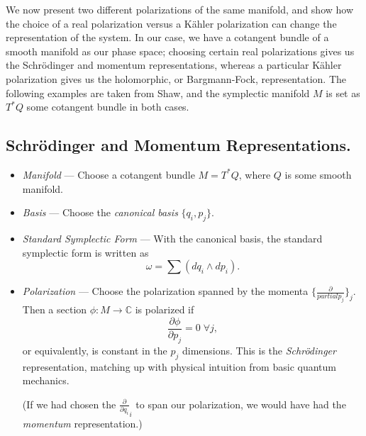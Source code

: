 \documentclass{tufte-handout}
\begin{document}
We now present two different polarizations of the same manifold, and show how the choice of a real polarization versus a K\"{a}hler polarization can change the representation of the system. In our case, we have a cotangent bundle of a smooth manifold as our phase space; choosing certain real polarizations gives us the Schr\"{o}dinger and momentum representations, whereas a particular K\"{a}hler polarization gives us the holomorphic, or Bargmann-Fock, representation. The following examples are taken from Shaw, and the symplectic manifold $M$ is set as $T^*Q$ some cotangent bundle in both cases.
\subsection{Schr\"{o}dinger and Momentum Representations.}
\begin{itemize}
\item \emph{Manifold} --- Choose a cotangent bundle $M = T^*Q$, where $Q$ is some smooth manifold.
\item \emph{Basis} --- Choose the \emph{canonical basis} $\{q_i, p_j\}$.
\item \emph{Standard Symplectic Form} --- With the canonical basis, the standard symplectic form is written as
$$
\omega = \sum (dq_i \wedge dp_i).
$$
\item \emph{Polarization} --- Choose the polarization spanned by the momenta $\{\frac{\partial}{partial p_j}\}_j$. Then a section $\phi: M \to \mathbb{C}$ is polarized if
$$
\frac{\partial \phi}{\partial p_j} = 0 \; \forall j,
$$
or equivalently, is constant in the $p_j$ dimensions. This is the \emph{Schr\"{o}dinger} representation, matching up with physical intuition from basic quantum mechanics.

(If we had chosen the $\frac{\partial}{\partial q_i}_i$ to span our polarization, we would have had the \emph{momentum} representation.)
\end{itemize}
\end{document}
